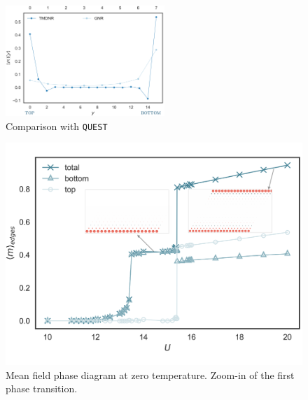 \begin{figure}[H]
  \centering
  \includegraphics[width=6cm]{images/magProf.png}
  \caption{Comparison with \texttt{QUEST}}
  \label{fig:blade_flow_pressure}
\end{figure}

\begin{figure}[H]
\includegraphics[trim={0cm 1.7cm 0cm 1.7cm},clip, scale =0.21]{images/edge-mag.pdf}
	\caption[Mean field phase diagram at zero temperature. Zoom-in of the first phase transition.]{Mean field phase diagram at zero temperature. Zoom-in of the first phase transition.
	\label{fig:zeroTphaseDiagram}}
\end{figure}

